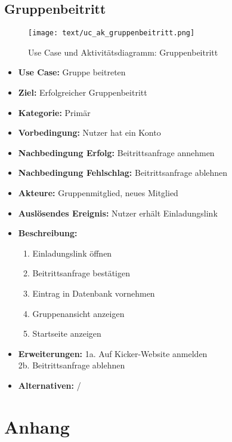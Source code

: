 \section{Gruppenbeitritt}
\begin{figure}[h!]
	\centering
	\texttt{[image: text/uc\_ak\_gruppenbeitritt.png]}
	\caption{Use Case und Aktivitätsdiagramm: Gruppenbeitritt}
	\label{uc_ac_gruppenbeitritt}
\end{figure}
\begin{itemize}
	\item \textbf{Use Case:} Gruppe beitreten
	\item \textbf{Ziel:} Erfolgreicher Gruppenbeitritt
	\item \textbf{Kategorie:} Primär
	\item \textbf{Vorbedingung:} Nutzer hat ein Konto
	\item \textbf{Nachbedingung Erfolg:} Beitrittsanfrage annehmen
	\item \textbf{Nachbedingung Fehlschlag:} Beitrittsanfrage ablehnen
	\item \textbf{Akteure:} Gruppenmitglied, neues Mitglied
	\item \textbf{Auslösendes Ereignis:} Nutzer erhält Einladungslink
	\item \textbf{Beschreibung:} \begin{enumerate}
		\item Einladungslink öffnen
		\item Beitrittsanfrage bestätigen
		\item Eintrag in Datenbank vornehmen
		\item Gruppenansicht anzeigen
		\item Startseite anzeigen
	\end{enumerate}
	\item \textbf{Erweiterungen:} 1a. Auf Kicker-Website anmelden\\
	2b. Beitrittsanfrage ablehnen
	\item \textbf{Alternativen:} /
\end{itemize}
\chapter{Anhang}
